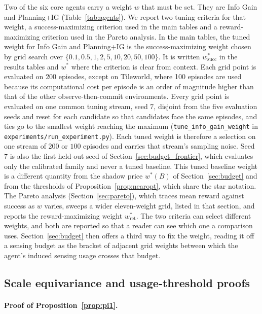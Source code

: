 Two of the six core agents carry a weight $w$ that must be set. They are Info Gain and Planning+IG (Table~\ref{tab:agents}). We report two tuning criteria for that weight, a success-maximizing criterion used in the main tables and a reward-maximizing criterion used in the Pareto analysis. In the main tables, the tuned weight for Info Gain and Planning+IG is the success-maximizing weight chosen by grid search over $\{0.1, 0.5, 1, 2, 5, 10, 20, 50, 100\}$. It is written $w^*_{\mathrm{succ}}$ in the results tables and $w^*$ where the criterion is clear from context. Each grid point is evaluated on 200 episodes, except on Tileworld, where 100 episodes are used because its computational cost per episode is an order of magnitude higher than that of the other observe-then-commit environments. Every grid point is evaluated on one common tuning stream, seed $7$, disjoint from the five evaluation seeds and reset for each candidate so that candidates face the same episodes, and ties go to the smallest weight reaching the maximum (\texttt{tune\_\allowbreak info\_\allowbreak gain\_\allowbreak weight} in \texttt{experiments/\allowbreak run\_\allowbreak experiment.py}). Each tuned weight is therefore a selection on one stream of $200$ or $100$ episodes and carries that stream's sampling noise. Seed $7$ is also the first held-out seed of Section~\ref{sec:budget_frontier}, which evaluates only the calibrated family and never a tuned baseline. This tuned baseline weight is a different quantity from the shadow price $w^*(B)$ of Section~\ref{sec:budget} and from the thresholds of Proposition~\ref{prop:nearopt}, which share the star notation. The Pareto analysis (Section~\ref{sec:pareto}), which traces mean reward against success as $w$ varies, sweeps a wider eleven-weight grid, listed in that section, and reports the reward-maximizing weight $w^*_{\mathrm{ret}}$. The two criteria can select different weights, and both are reported so that a reader can see which one a comparison uses. Section~\ref{sec:budget} then offers a third way to fix the weight, reading it off a sensing budget as the bracket of adjacent grid weights between which the agent's induced sensing usage crosses that budget.

\subsection{Scale equivariance and usage-threshold proofs}
\label{app:theory_budget_proofs}

\paragraph{Proof of Proposition~\ref{prop:pi1}.}

